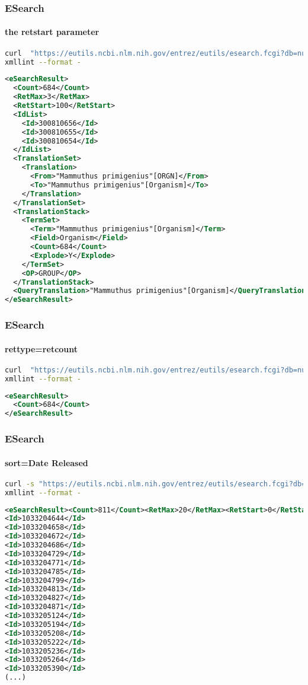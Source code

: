 \documentclass{beamer}
\begin{document}
\begin{frame}[fragile]
\frametitle{ESearch}
\framesubtitle{the retstart parameter }
\begin{lstlisting}[language=bash,basicstyle=\tiny,breaklines=true]
curl  "https://eutils.ncbi.nlm.nih.gov/entrez/eutils/esearch.fcgi?db=nucleotide&term=%22Mammuthus%20primigenius%22%5BORGN%5D&retmax=3&retstart=100" |\
xmllint --format -
\end{lstlisting}

\begin{lstlisting}[language=xml,basicstyle=\tiny,breaklines=false]
<eSearchResult>
  <Count>684</Count>
  <RetMax>3</RetMax>
  <RetStart>100</RetStart>
  <IdList>
    <Id>300810656</Id>
    <Id>300810655</Id>
    <Id>300810654</Id>
  </IdList>
  <TranslationSet>
    <Translation>
      <From>"Mammuthus primigenius"[ORGN]</From>
      <To>"Mammuthus primigenius"[Organism]</To>
    </Translation>
  </TranslationSet>
  <TranslationStack>
    <TermSet>
      <Term>"Mammuthus primigenius"[Organism]</Term>
      <Field>Organism</Field>
      <Count>684</Count>
      <Explode>Y</Explode>
    </TermSet>
    <OP>GROUP</OP>
  </TranslationStack>
  <QueryTranslation>"Mammuthus primigenius"[Organism]</QueryTranslation>
</eSearchResult>
\end{lstlisting}
\end{frame}

\begin{frame}[fragile]
\frametitle{ESearch}
\framesubtitle{rettype=retcount  }
\begin{lstlisting}[language=bash,basicstyle=\tiny,breaklines=true]
curl  "https://eutils.ncbi.nlm.nih.gov/entrez/eutils/esearch.fcgi?db=nucleotide&term=%22Mammuthus%20primigenius%22%5BORGN%5D&rettype=count" |\
xmllint --format -
\end{lstlisting}

\begin{lstlisting}[language=xml,breaklines=false]
<eSearchResult>
  <Count>684</Count>
</eSearchResult>
\end{lstlisting}
\end{frame}


\begin{frame}[fragile]
\frametitle{ESearch}
\framesubtitle{sort=Date Released  }
\begin{lstlisting}[language=bash,basicstyle=\tiny,breaklines=true]
curl -s "https://eutils.ncbi.nlm.nih.gov/entrez/eutils/esearch.fcgi?db=nucleotide&term=%22Mammuthus%20primigenius%22%5BORGN%5D&sort=Date+Released"
xmllint --format -
\end{lstlisting}

\begin{lstlisting}[language=xml,breaklines=false]
<eSearchResult><Count>811</Count><RetMax>20</RetMax><RetStart>0</RetStart><IdList>
<Id>1033204644</Id>
<Id>1033204658</Id>
<Id>1033204672</Id>
<Id>1033204686</Id>
<Id>1033204729</Id>
<Id>1033204771</Id>
<Id>1033204785</Id>
<Id>1033204799</Id>
<Id>1033204813</Id>
<Id>1033204827</Id>
<Id>1033204871</Id>
<Id>1033205124</Id>
<Id>1033205194</Id>
<Id>1033205208</Id>
<Id>1033205222</Id>
<Id>1033205236</Id>
<Id>1033205264</Id>
<Id>1033205390</Id>
(...)
\end{lstlisting}
\end{frame}
\end{document}
